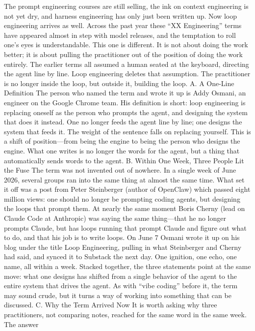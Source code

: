 \documentclass[conference]{IEEEtran}
\begin{document}
The prompt engineering courses are still selling, the ink on
context engineering is not yet dry, and harness engineering has
only just been written up. Now loop engineering arrives as
well. Across the past year these “XX Engineering” terms have
appeared almost in step with model releases, and the temptation
to roll one’s eyes is understandable.
This one is different. It is not about doing the work better; it
is about pulling the practitioner out of the position of doing the
work entirely. The earlier terms all assumed a human seated at
the keyboard, directing the agent line by line. Loop engineering
deletes that assumption. The practitioner is no longer inside the
loop, but outside it, building the loop.
A. A One-Line Definition
The person who named the term and wrote it up is Addy
Osmani, an engineer on the Google Chrome team. His definition
is short: loop engineering is replacing oneself as the person
who prompts the agent, and designing the system that does it
instead. One no longer feeds the agent line by line; one designs
the system that feeds it. The weight of the sentence falls on
replacing yourself. This is a shift of position—from being the
engine to being the person who designs the engine. What one
writes is no longer the words for the agent, but a thing that
automatically sends words to the agent.
B. Within One Week, Three People Lit the Fuse
The term was not invented out of nowhere. In a single week
of June 2026, several groups ran into the same thing at almost
the same time. What set it off was a post from Peter Steinberger
(author of OpenClaw) which passed eight million views: one
should no longer be prompting coding agents, but designing
the loops that prompt them. At nearly the same moment Boris
Cherny (lead on Claude Code at Anthropic) was saying the same
thing—that he no longer prompts Claude, but has loops running
that prompt Claude and figure out what to do, and that his job
is to write loops. On June 7 Osmani wrote it up on his blog
under the title Loop Engineering, pulling in what Steinberger
and Cherny had said, and synced it to Substack the next day.
One ignition, one echo, one name, all within a week.
Stacked together, the three statements point at the same move:
what one designs has shifted from a single behavior of the agent
to the entire system that drives the agent. As with “vibe coding”
before it, the term may sound crude, but it turns a way of working
into something that can be discussed.
C. Why the Term Arrived Now
It is worth asking why three practitioners, not comparing
notes, reached for the same word in the same week. The answer
\end{document}
